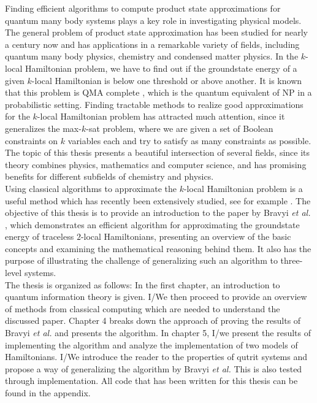 Finding efficient algorithms to compute product state approximations for quantum many body systems plays a key role in investigating physical models.
The general problem of product state approximation has been studied for nearly a century now and has applications in a remarkable variety of fields, including quantum many body physics, chemistry and condensed matter physics.
In the $k$-local Hamiltonian problem, we have to find out if the groundstate energy of a given $k$-local Hamiltonian is below one threshold or above another.
It is known that this problem is QMA complete \cite{kempe06}, which is the quantum equivalent of NP in a probabilistic setting.
Finding tractable methods to realize good approximations for the $k$-local Hamiltonian problem has attracted much attention, since it generalizes the max-$k$-sat problem, where we are given a set of Boolean constraints on $k$ variables each and try to satisfy as many constraints as possible.
The topic of this thesis presents a beautiful intersection of several fields, since its theory combines physics, mathematics and computer science, and has promising benefits for different subfields of chemistry and physics.\\
Using classical algorithms to approximate the $k$-local Hamiltonian problem is a useful method which has recently been extensively studied, see for example \cite{gharibian19, gharibian12, kempe06, brandao14, harrow17,bravyi19,anshu20}.
The objective of this thesis is to provide an introduction to the paper by Bravyi \emph{et al.} \cite{bravyi19}, which demonstrates an efficient algorithm for approximating the groundstate energy of traceless $2$-local Hamiltonians, presenting an overview of the basic concepts and examining the mathematical reasoning behind them.
It also has the purpose of illustrating the challenge of generalizing such an algorithm to three-level systems.\\
The thesis is organized as follows:
In the first chapter, an introduction to quantum information theory is given.
I/We then proceed to provide an overview of methods from classical computing which are needed to understand the discussed paper.
Chapter 4 breaks down the approach of proving the results of Bravyi \emph{et al.} and presents the algorithm.
In chapter 5, I/we present the results of implementing the algorithm and analyze the implementation of two models of Hamiltonians.
I/We introduce the reader to the properties of qutrit systems and propose a way of generalizing the algorithm by Bravyi \emph{et al.}
This is also tested through implementation.
All code that has been written for this thesis can be found in the appendix.
